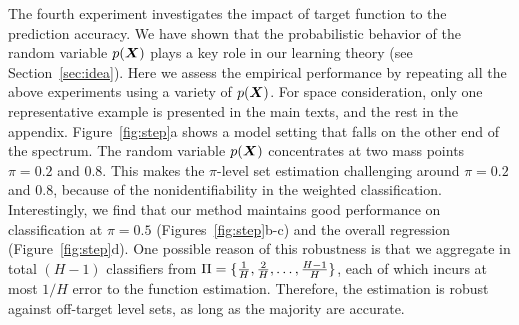 \documentclass[11pt]{article}
\theoremstyle{plain}
\theoremstyle{definition}
\begin{document}
The fourth experiment investigates the impact of target function to the prediction accuracy. We have shown that the probabilistic behavior of the random variable $p(\bm X)$ plays a key role in our learning theory (see Section~\ref{sec:idea}). Here we assess the empirical performance by repeating all the above experiments using a variety of $p(\bm X)$. For space consideration, only one representative example is presented in the main texts, and the rest in the appendix. Figure~\ref{fig:step}a shows a model setting that falls on the other end of the spectrum. The random variable $p(\bm X)$ concentrates at two mass points $\pi=0.2$ and $0.8$. This makes the $\pi$-level set estimation challenging around $\pi=0.2$ and $0.8$, because of the nonidentifiability in the weighted classification. Interestingly, we find that our method maintains good performance on classification at $\pi=0.5$ (Figures~\ref{fig:step}b-c) and the overall regression (Figure~\ref{fig:step}d). One possible reason of this robustness is that we aggregate in total $(H-1)$ classifiers from $\Pi=\{{1\over H}, {2\over H},\ldots,{H-1\over H}\}$, each of which incurs at most $1/H$ error to the function estimation. Therefore, the estimation is robust against off-target level sets, as long as the majority are accurate.  
\end{document}
